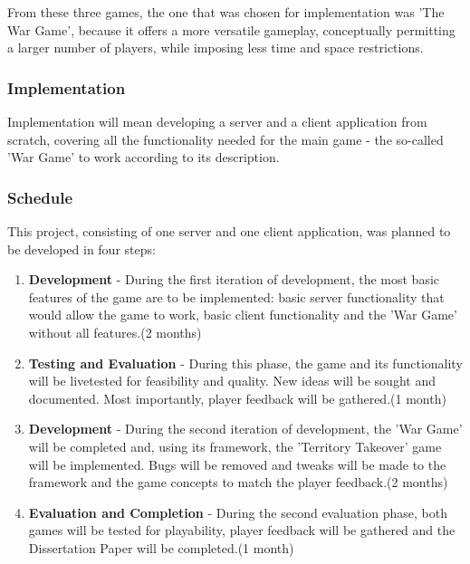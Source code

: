 From these three games, the one that was chosen for implementation was 'The War
Game', because it offers a more versatile gameplay, conceptually permitting
a larger number of players, while imposing less time and space restrictions.


\subsubsection{Implementation}

Implementation will mean developing a server and a client application from
scratch, covering all the functionality needed for the main game - the so-called
'War Game' to work according to its description.

\subsubsection{Schedule}
This project, consisting of one server and one client application, was planned
to be developed in four steps:


\begin{enumerate}
  \item \textbf{Development} - During the first iteration of development, the
  most basic features of the game are to be implemented: basic server
  functionality that would allow the game to work, basic client functionality
  and the 'War Game' without all features.(2 months)
  
  \item \textbf{Testing and Evaluation} - During this phase, the game and its
  functionality will be livetested for feasibility and quality. New ideas will
  be sought and documented. Most importantly, player feedback will be
  gathered.(1 month)
  
  \item \textbf{Development} - During the second iteration of development, the
  'War Game' will be completed and, using its framework, the 'Territory
  Takeover' game will be implemented. Bugs will be removed and tweaks will be
  made to the framework and the game concepts to match the player feedback.(2
  months)
  
  \item \textbf{Evaluation and Completion} - During the second evaluation phase,
  both games will be tested for playability, player feedback will be gathered
  and the Dissertation Paper will be completed.(1 month)
    
\end{enumerate}




